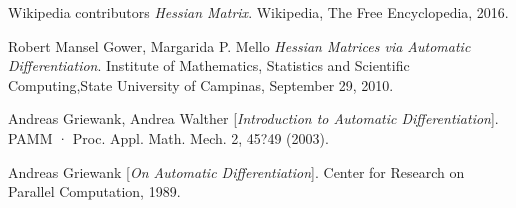 \documentclass[oneside]{article}
\begin{document}
\begin{thebibliography}{9}
Wikipedia contributors
\textit{Hessian Matrix}.
Wikipedia, The Free Encyclopedia, 2016.

Robert Mansel Gower, Margarida P. Mello
\textit{Hessian Matrices via Automatic Differentiation}.
Institute of Mathematics, Statistics and Scientific Computing,State University of Campinas, September 29, 2010.


 Andreas Griewank, Andrea Walther
[\textit{Introduction to Automatic Differentiation}].
PAMM · Proc. Appl. Math. Mech. 2, 45?49 (2003).

 Andreas Griewank
[\textit{On Automatic Differentiation}].
Center for Research on Parallel Computation, 1989.

\end{thebibliography}
\end{document}
